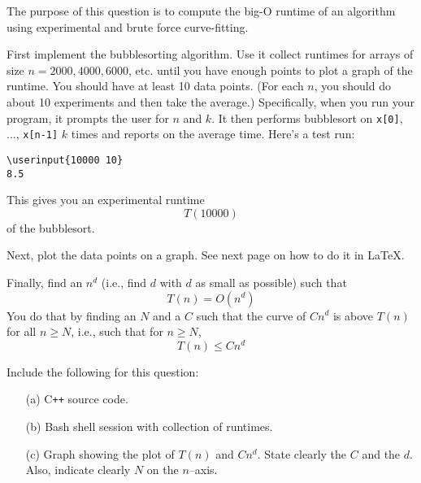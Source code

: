 The purpose of this question is to compute the big-O runtime
of an algorithm using experimental and brute force curve-fitting.

First implement the bubblesorting algorithm.
Use it collect runtimes for arrays of size $n = 2000, 4000, 6000$, etc.
until you have enough points to plot a graph of the runtime.
You should have at least 10 data points.
(For each $n$, you should do about 10 experiments and then take
the average.)
Specifically, when you run your program, it prompts
the user for $n$ and $k$.
It then
performs bubblesort on \verb!x[0]!, ..., \verb!x[n-1]! $k$ times and
reports on the average time.
Here's a test run:
\begin{Verbatim}[fontsize=\small,frame=single, commandchars=\\\{\}]
\userinput{10000 10}
8.5
\end{Verbatim}
This gives you an experimental runtime
\[
T(10000)
\]
of the bubblesort.

Next, plot the data points on a graph.
See next page on how to do it in \LaTeX.

Finally, find an $n^d$ (i.e., find $d$ with $d$ as small as possible)
such that
\[
T(n) = O(n^d)
\]
You do that by finding an $N$ and a $C$ such that
the curve of $Cn^d$ is above $T(n)$ for all $n \geq N$, i.e.,
such that for $n \geq N$,
\[
T(n) \leq C n^d
\]

Include the following for this question:
\begin{enumerate}[nosep]
\item[(a)] C\texttt{++} source code.
  \item[(b)] Bash shell session with collection of runtimes.
  \item[(c)] Graph showing the plot of $T(n)$ and $Cn^d$. State clearly the $C$
  and the $d$. Also, indicate clearly $N$ on the $n$--axis.
\end{enumerate}
